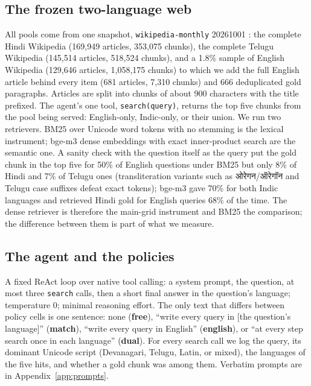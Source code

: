 \subsection{The frozen two-language web}
\label{sec:pool}
All pools come from one snapshot, \texttt{wikipedia-monthly} 20261001 \citep{wikipediamonthly2026}: the complete Hindi Wikipedia (169{,}949 articles, 353{,}075 chunks), the complete Telugu Wikipedia (145{,}514 articles, 518{,}524 chunks), and a 1.8\% sample of English Wikipedia (129{,}646 articles, 1{,}058{,}175 chunks) to which we add the full English article behind every item (681 articles, 7{,}310 chunks) and 666 deduplicated gold paragraphs. Articles are split into chunks of about 900 characters with the title prefixed. The agent's one tool, \texttt{search(query)}, returns the top five chunks from the pool being served: English-only, Indic-only, or their union. We run two retrievers. BM25 \citep{robertson2009bm25,a2407_03618} over Unicode word tokens with no stemming is the lexical instrument; bge-m3 dense embeddings \citep{a2402_03216} with exact inner-product search are the semantic one. A sanity check with the question itself as the query put the gold chunk in the top five for 50\% of English questions under BM25 but only 8\% of Hindi and 7\% of Telugu ones (transliteration variants such as {\deva ओरेगन}/{\deva ऑरेगॉन} and Telugu case suffixes defeat exact tokens); bge-m3 gave 70\% for both Indic languages and retrieved Hindi gold for English queries 68\% of the time. The dense retriever is therefore the main-grid instrument and BM25 the comparison; the difference between them is part of what we measure.

\subsection{The agent and the policies}
\label{sec:agent}
A fixed ReAct loop \citep{a2210_03629} over native tool calling: a system prompt, the question, at most three \texttt{search} calls, then a short final answer in the question's language; temperature 0; minimal reasoning effort. The only text that differs between policy cells is one sentence: none (\textbf{free}), ``write every query in [the question's language]'' (\textbf{match}), ``write every query in English'' (\textbf{english}), or ``at every step search once in each language'' (\textbf{dual}). For every search call we log the query, its dominant Unicode script (Devanagari, Telugu, Latin, or mixed), the languages of the five hits, and whether a gold chunk was among them. Verbatim prompts are in Appendix~\ref{app:prompts}.

